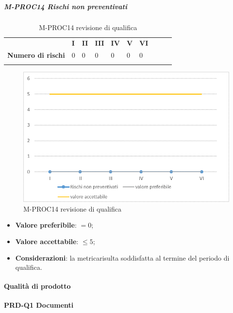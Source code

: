 \subparagraph{M-PROC14 Rischi non preventivati} \mbox{}
\begin{longtable}[H!] {						
		>{}p{50mm}  		
		>{}p{8mm}
		>{}p{8mm}		
		>{}p{8mm}		
		>{}p{8mm}		
		>{}p{8mm}		
		>{}p{8mm}
		>{}p{8mm}
		>{}p{8mm}
		>{}p{8mm}
	}
	\rowcolor{gray!50}
	\textbf{} & \textbf{I} & \textbf{II} & \textbf{III} & \textbf{IV} & \textbf{V} & \textbf{VI} \TBstrut \\ [2mm]
	\textbf{Numero di rischi} & 0 & 0 & 0 & 0 & 0 & 0 \TBstrut \\ [2mm]
	\rowcolor{white}
	\caption{M-PROC14 revisione di qualifica}
\end{longtable}
\begin{figure}[H] 	
	\includegraphics[width=\linewidth]{./img/grafici/RQ14.png}	
	\caption{M-PROC14 revisione di qualifica}	
\end{figure}
\begin{itemize}
	\item \textbf{Valore preferibile}: $=0$;
	\item \textbf{Valore accettabile}: $\le 5$;
	\item \textbf{Considerazioni}: la metrica\glosp risulta soddisfatta al termine del periodo di qualifica.
\end{itemize}

\paragraph{Qualità di prodotto}

\paragraph*{PRD-Q1 Documenti}
